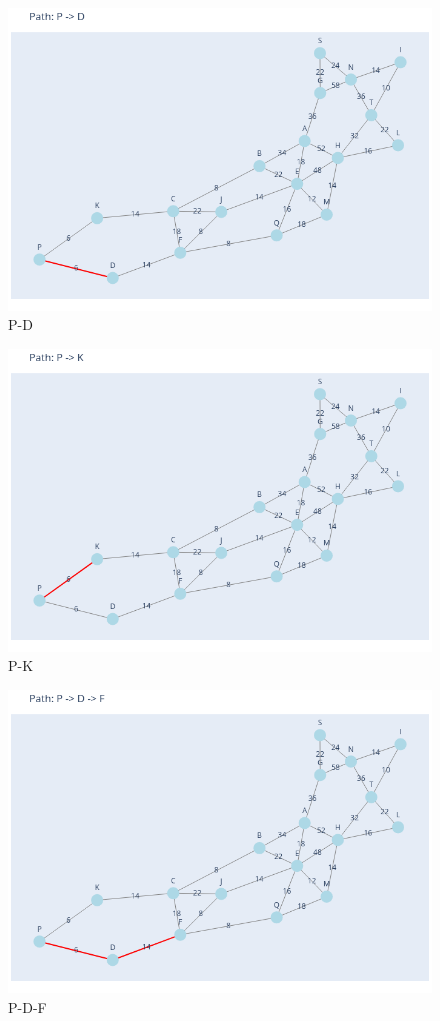 \documentclass[11pt]{book}
\renewcommand{\=}[1]{\stackrel{#1}{=}} %
\theoremstyle{definition}
\theoremstyle{remark}
\begin{document}
\begin{figure}
    \centering
    \includegraphics[width=0.7\linewidth]{Plots/P_D.png}
    \caption{P-D}
    \label{fig:enter-label}
\end{figure}
\begin{figure}
    \centering
    \includegraphics[width=0.7\linewidth]{Plots/P_K.png}
    \caption{P-K}
    \label{fig:enter-label}
\end{figure}
\begin{figure}
    \centering
    \includegraphics[width=0.7\linewidth]{Plots/P_D_F.png}
    \caption{P-D-F}
    \label{fig:enter-label}
\end{figure}
\end{document}
